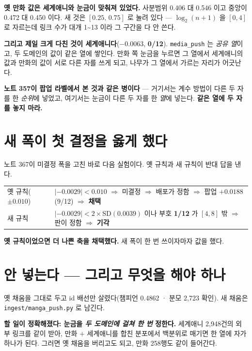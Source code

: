 \documentclass[11pt]{article}
\begin{document}
\textbf{옛 만화 값은 세계애니와 눈금이 맞춰져 있었다.} 사분범위 0.406 대
0.546 이고 중앙이 0.472 대 0.450 이다. 새 것은 $[0.25,\,0.75]$ 로 눌려
있다 --- $\log_2(n+1)$ 을 $[0,4]$ 로 자르는데 링크 수가 대개 1\textasciitilde{}13
이라 그 구간을 다 안 쓴다.

\textbf{그리고 제일 크게 다친 것이 세계애니다}($-0.0063$, \textbf{0/12}).
\texttt{media\_push} 는 \emph{공유 열}이고, 두 도메인의 값이 같은 열에
쌓인다. 만화 쪽 눈금을 누르면 그 열에서 세계애니의 값과 만화의 값이
서로 다른 자를 쓰게 되고, 나무가 그 열에서 가르는 자리가 어긋난다.

\textbf{노트 357이 팝업 라벨에서 본 것과 같은 병이다} --- 거기서는 계수
방법이 다른 두 자를 한 \emph{순위}에 넣었고, 여기서는 눈금이 다른 두 자를
한 \emph{열}에 넣는다. \textbf{같은 열에 두 자를 놓지 마라.}

\section{새 폭이 첫 결정을 옳게 했다}

노트 367이 미결정 폭을 고친 바로 다음 실험이다. 옛 규칙과 새 규칙이
반대 답을 낸다.

\begin{center}
\begin{tabular}{ll}
\hline
옛 규칙($\pm0.010$) & $|-0.0029| < 0.010$ $\Rightarrow$ 미결정 $\Rightarrow$
배포가 정함 $\Rightarrow$ 팝업 $+0.0188$(9/12) $\Rightarrow$ \textbf{채택} \\
새 규칙 & $|-0.0029| < 2{\times}$SD$(0.0039)$ 이나 부호 \textbf{1/12} 가
$[4,8]$ 밖 $\Rightarrow$ 판이 정함 $\Rightarrow$ \textbf{기각} \\
\hline
\end{tabular}
\end{center}

\textbf{옛 규칙이었으면 더 나쁜 축을 채택했다.} 새 폭이 한 번 쓰이자마자
값을 했다.

\section{안 넣는다 --- 그리고 무엇을 해야 하나}

옛 채움을 그대로 두고 id 배선만 살렸다(챔피언 0.4862 · 분모 2,723 확인).
새 채움은 \texttt{ingest/manga\_push.py} 로 남긴다.

\textbf{할 일이 정확해졌다: 눈금을 \emph{두 도메인에 걸쳐 한 번} 정한다.}
세계애니 2,948건의 외부 링크를 같이 받아, 만화 $+$ 세계애니를 합친
분포에서 백분위로 매기면 한 열에 자가 하나가 된다. 그러면 옛 채움을
버리고도 되고, 만화 258행도 같이 들어간다.
\end{document}
